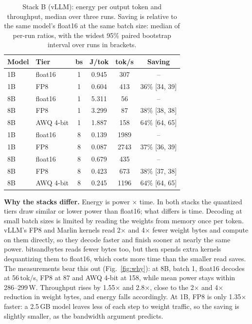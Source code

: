 \documentclass[conference]{IEEEtran}
\begin{document}
\begin{table}[t]
\caption{Stack B (vLLM): energy per output token and throughput, median over three runs. Saving is relative to the same model's float16 at the same batch size: median of per-run ratios, with the widest 95\% paired bootstrap interval over runs in brackets.}
\label{tab:vllm}
\centering\small
\setlength{\tabcolsep}{3pt}
\begin{tabular}{llcccc}
\toprule
Model & Tier & bs & J/tok & tok/s & Saving \\
\midrule
1B & float16 & 1 & 0.945 & 307 & -- \\
1B & FP8 & 1 & 0.604 & 413 & $36\%$ \footnotesize[34, 39] \\
8B & float16 & 1 & 5.311 & 56 & -- \\
8B & FP8 & 1 & 3.299 & 87 & $38\%$ \footnotesize[38, 38] \\
8B & AWQ 4-bit & 1 & 1.887 & 158 & $64\%$ \footnotesize[64, 65] \\
\midrule
1B & float16 & 8 & 0.139 & 1989 & -- \\
1B & FP8 & 8 & 0.087 & 2743 & $37\%$ \footnotesize[36, 39] \\
8B & float16 & 8 & 0.679 & 435 & -- \\
8B & FP8 & 8 & 0.423 & 673 & $38\%$ \footnotesize[37, 38] \\
8B & AWQ 4-bit & 8 & 0.245 & 1196 & $64\%$ \footnotesize[64, 65] \\
\bottomrule
\end{tabular}
\end{table}

\textbf{Why the stacks differ.} Energy is power $\times$ time. In both stacks the quantized tiers draw similar or lower power than float16; what differs is time. Decoding at small batch sizes is limited by reading the weights from memory once per token. vLLM's FP8 and Marlin kernels read 2$\times$ and 4$\times$ fewer weight bytes and compute on them directly, so they decode faster and finish sooner at nearly the same power. bitsandbytes reads fewer bytes too, but then spends extra kernels dequantizing them to float16, which costs more time than the smaller read saves. The measurements bear this out (Fig.~\ref{fig:why}): at 8B, batch 1, float16 decodes at 56\,tok/s, FP8 at 87 and AWQ 4-bit at 158, while mean power stays within 286--299\,W. Throughput rises by 1.55$\times$ and 2.8$\times$, close to the 2$\times$ and 4$\times$ reduction in weight bytes, and energy falls accordingly. At 1B, FP8 is only 1.35$\times$ faster: a 2.5\,GB model leaves less of each step to weight traffic, so the saving is slightly smaller, as the bandwidth argument predicts.
\end{document}
